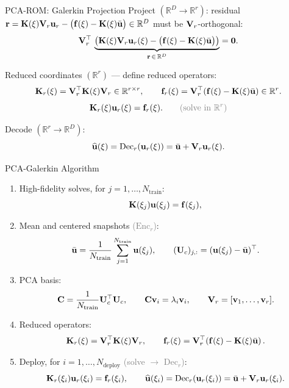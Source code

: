\documentclass[10pt,aspectratio=169]{ntuabeamer}
\begin{document}
\begin{frame}{PCA-ROM: Galerkin Projection}
  \small
  \textcolor{ntuablue}{Project} \((\mathbb{R}^D\to\mathbb{R}^r)\): residual
  \(\mathbf{r}=\mathbf{K}(\xi)\mathbf{V}_r\mathbf{u}_r-\bigl(\mathbf{f}(\xi)-\mathbf{K}(\xi)\bar{\mathbf{u}}\bigr)\in\mathbb{R}^D\)
  must be \(\mathbf{V}_r\)-orthogonal:
  \[
    \mathbf{V}_r^{\top}\,\underbrace{
      \left(
        \mathbf{K}(\xi)\mathbf{V}_r\mathbf{u}_r(\xi)
        -
        \bigl(\mathbf{f}(\xi)-\mathbf{K}(\xi)\bar{\mathbf{u}}\bigr)
      \right)
    }_{\mathbf{r}\,\in\,\mathbb{R}^D}
    =
    \mathbf{0}.
  \]

  \textcolor{ntuablue}{Reduced coordinates} \((\mathbb{R}^r)\) — define reduced operators:
  \[
    \mathbf{K}_r(\xi) = \mathbf{V}_r^{\top}\mathbf{K}(\xi)\mathbf{V}_r \in\mathbb{R}^{r\times r},
    \qquad
    \mathbf{f}_r(\xi) = \mathbf{V}_r^{\top}\!\left(\mathbf{f}(\xi) - \mathbf{K}(\xi)\bar{\mathbf{u}}\right)\in\mathbb{R}^r.
  \]
  \[
    \bd{K}_r(\xi)\bd{u}_r(\xi) = \bd{f}_r(\xi).
    \qquad\textcolor{gray}{\text{(solve in }\mathbb{R}^r\text{)}}
  \]

  \textcolor{ntuablue}{Decode} \((\mathbb{R}^r\to\mathbb{R}^D)\):
  \[
    \widehat{\mathbf{u}}(\xi)=\mathrm{Dec}_r(\mathbf{u}_r(\xi))=\bar{\mathbf{u}}+\mathbf{V}_r\mathbf{u}_r(\xi).
  \]
\end{frame}

\begin{frame}{PCA-Galerkin Algorithm}
  \small
  \begin{enumerate}
    \item High-fidelity solves, for \(j=1,\dots,N_{\mathrm{train}}\):
    \[
      \mathbf{K}(\xi_j)\mathbf{u}(\xi_j)=\mathbf{f}(\xi_j),
    \]
    \item Mean and centered snapshots \textcolor{gray}{(\(\mathrm{Enc}_r\))}:
    \[
      \bar{\mathbf{u}}=\frac{1}{N_{\mathrm{train}}}\sum_{j=1}^{N_{\mathrm{train}}}\mathbf{u}(\xi_j),
      \qquad
      (\mathbf{U}_c)_{j,:}=(\mathbf{u}(\xi_j)-\bar{\mathbf{u}})^{\top}.
    \]
    \item PCA basis:
    \[
      \mathbf{C}=\frac{1}{N_{\mathrm{train}}}\mathbf{U}_c^{\top}\mathbf{U}_c,
      \qquad
      \mathbf{C}\mathbf{v}_i=\lambda_i\mathbf{v}_i,
      \qquad
      \mathbf{V}_r=[\mathbf{v}_1,\dots,\mathbf{v}_r].
    \]
    \item Reduced operators:
    \[
      \mathbf{K}_r(\xi)=\mathbf{V}_r^{\top}\mathbf{K}(\xi)\mathbf{V}_r,
      \qquad
      \mathbf{f}_r(\xi)=\mathbf{V}_r^{\top}\!\left(\mathbf{f}(\xi)-\mathbf{K}(\xi)\bar{\mathbf{u}}\right).
    \]
    \item Deploy, for \(i=1,\dots,N_{\mathrm{deploy}}\)
          \textcolor{gray}{(solve \(\to\) \(\mathrm{Dec}_r\))}:
    \[
      \mathbf{K}_r(\xi_i)\mathbf{u}_r(\xi_i)=\mathbf{f}_r(\xi_i),
      \qquad
      \widehat{\mathbf{u}}(\xi_i)=\mathrm{Dec}_r(\mathbf{u}_r(\xi_i))=\bar{\mathbf{u}}+\mathbf{V}_r\mathbf{u}_r(\xi_i).
    \]
  \end{enumerate}
\end{frame}
\end{document}
